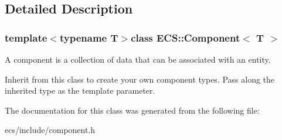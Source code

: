 \subsection{Detailed Description}
\subsubsection*{template$<$typename T$>$class E\-C\-S\-::\-Component$<$ T $>$}

A component is a collection of data that can be associated with an entity. 

Inherit from this class to create your own component types. Pass along the inherited type as the template parameter. 

The documentation for this class was generated from the following file\-:\begin{DoxyCompactItemize}
\item 
ecs/include/component.\-h\end{DoxyCompactItemize}
